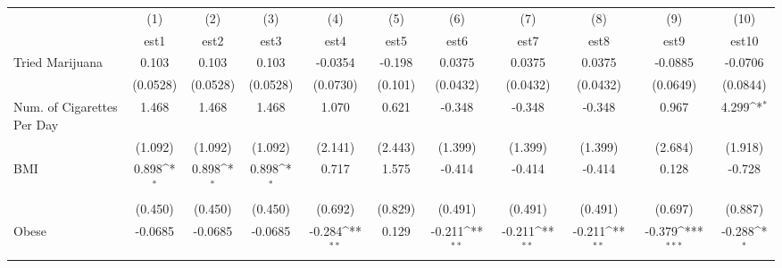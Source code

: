 {
\def\sym#1{\ifmmode^{#1}\else\(^{#1}\)\fi}
\begin{tabular}{l*{10}{c}}
\toprule
            &\multicolumn{1}{c}{(1)}&\multicolumn{1}{c}{(2)}&\multicolumn{1}{c}{(3)}&\multicolumn{1}{c}{(4)}&\multicolumn{1}{c}{(5)}&\multicolumn{1}{c}{(6)}&\multicolumn{1}{c}{(7)}&\multicolumn{1}{c}{(8)}&\multicolumn{1}{c}{(9)}&\multicolumn{1}{c}{(10)}\\
            &\multicolumn{1}{c}{est1}&\multicolumn{1}{c}{est2}&\multicolumn{1}{c}{est3}&\multicolumn{1}{c}{est4}&\multicolumn{1}{c}{est5}&\multicolumn{1}{c}{est6}&\multicolumn{1}{c}{est7}&\multicolumn{1}{c}{est8}&\multicolumn{1}{c}{est9}&\multicolumn{1}{c}{est10}\\
\midrule
Tried Marijuana&       0.103         &       0.103         &       0.103         &     -0.0354         &      -0.198         &      0.0375         &      0.0375         &      0.0375         &     -0.0885         &     -0.0706         \\
            &    (0.0528)         &    (0.0528)         &    (0.0528)         &    (0.0730)         &     (0.101)         &    (0.0432)         &    (0.0432)         &    (0.0432)         &    (0.0649)         &    (0.0844)         \\
\addlinespace
Num. of Cigarettes Per Day&       1.468         &       1.468         &       1.468         &       1.070         &       0.621         &      -0.348         &      -0.348         &      -0.348         &       0.967         &       4.299\sym{*}  \\
            &     (1.092)         &     (1.092)         &     (1.092)         &     (2.141)         &     (2.443)         &     (1.399)         &     (1.399)         &     (1.399)         &     (2.684)         &     (1.918)         \\
\addlinespace
BMI         &       0.898\sym{*}  &       0.898\sym{*}  &       0.898\sym{*}  &       0.717         &       1.575         &      -0.414         &      -0.414         &      -0.414         &       0.128         &      -0.728         \\
            &     (0.450)         &     (0.450)         &     (0.450)         &     (0.692)         &     (0.829)         &     (0.491)         &     (0.491)         &     (0.491)         &     (0.697)         &     (0.887)         \\
\addlinespace
Obese       &     -0.0685         &     -0.0685         &     -0.0685         &      -0.284\sym{**} &       0.129         &      -0.211\sym{**} &      -0.211\sym{**} &      -0.211\sym{**} &      -0.379\sym{***}&      -0.288\sym{*}  \\

\end{tabular}}

